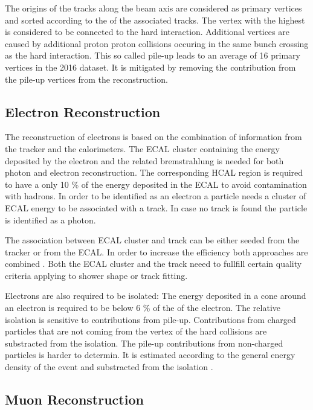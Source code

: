 The origins of the tracks along the beam axis are considered as primary vertices and sorted according to the \pt of the associated tracks.
The vertex with the highest \pt is considered to be connected to the hard interaction. 
Additional vertices are caused by additional proton proton collisions occuring in the same bunch crossing as the hard interaction.
This so called pile-up leads to an average of 16 primary vertices in the 2016 dataset. It is mitigated by removing the contribution from
the pile-up vertices from the reconstruction.

\subsection{Electron Reconstruction}

The reconstruction of electrons is based on the combination of information from the tracker and the calorimeters.
The ECAL cluster containing the energy deposited by the electron and the related bremstrahlung is needed for both photon and electron reconstruction.
The corresponding HCAL region is required to have a only 10 \% of the energy deposited in the ECAL to avoid contamination with hadrons.
In order to be identified as an electron a particle needs a cluster of ECAL energy to be associated with a track.
In case no track is found the particle is identified as a photon.

The association between ECAL cluster and track can be either seeded from the tracker or from the ECAL.
In order to increase the efficiency both approaches are combined .
Both the ECAL cluster and the track neeed to fullfill certain quality criteria applying to shower shape or track fitting.

Electrons are also required to be isolated: The energy deposited in a cone around an electron is required to be below 6 \% of the \pt of the electron.
The relative isolation is sensitive to contributions from pile-up. Contributions from charged particles that are not coming from the vertex of the hard collisions
are substracted from the isolation. The pile-up contributions from non-charged particles is harder to determin. It is estimated according to the general energy density
of the event and substracted from the isolation .

\subsection{Muon Reconstruction}

